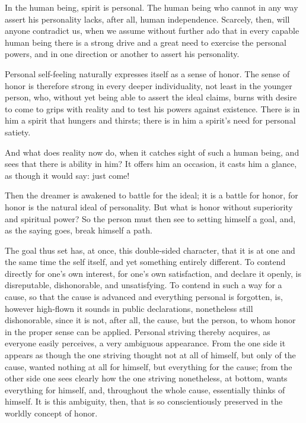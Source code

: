 \documentclass[12pt,a4paper]{book}
\begin{document}
In the human being, spirit is personal. The human being who cannot in any way assert his personality lacks, after all, human independence. Scarcely, then, will anyone contradict us, when we assume without further ado that in every capable human being there is a strong drive and a great need to
exercise the personal powers, and in one direction or another to assert his personality.

Personal self-feeling naturally expresses itself as a sense of honor. The sense of honor is therefore strong in every deeper individuality, not least in the younger person, who, without yet being able to assert the ideal claims, burns with desire to come to grips with reality and to test his powers against existence. There is in him a spirit that hungers and thirsts; there is in him a spirit's need for personal satiety.

And what does reality now do, when it catches sight of such a human being, and sees that there is ability in him? It offers him an occasion, it casts him a glance, as though it would say: just come!

Then the dreamer is awakened to battle for the ideal; it is a battle for honor, for honor is the natural ideal of personality. But what is honor without superiority and spiritual power? So the person must then see to setting himself a goal, and, as the saying goes, break himself a path.

The goal thus set has, at once, this double-sided character, that it is at one and the same time the self itself, and yet something entirely different. To contend directly for one's own interest, for one's own satisfaction, and declare it openly, is disreputable, dishonorable, and unsatisfying. To contend in such a way for a cause, so that the cause is advanced and everything personal is forgotten, is, however high-flown it sounds in public declarations, nonetheless still dishonorable, since it is not, after all, the cause, but the person, to whom honor in the proper sense can be applied. Personal striving thereby acquires, as everyone easily perceives, a very ambiguous appearance. From the one side it appears as though the one striving thought not at all of himself, but only of the cause, wanted nothing at all for himself, but everything for the cause; from the other side one sees clearly how the one striving nonetheless, at bottom, wants everything for himself, and, throughout the whole cause, essentially thinks of
himself. It is this ambiguity, then, that is so conscientiously preserved in the worldly concept of honor.
\end{document}
